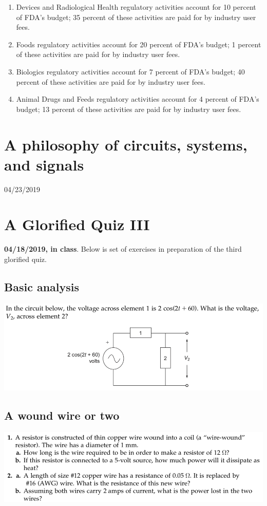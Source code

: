 \documentclass[11pt]{book}
\begin{document}
\begin{enumerate}
	\item Devices and Radiological Health regulatory activities account for 10 percent of FDA’s budget; 35 percent of these activities are paid for by industry user fees.
	\item Foods regulatory activities account for 20 percent of FDA’s budget; 1 percent of these activities are paid for by industry user fees.
	\item Biologics regulatory activities account for 7 percent of FDA’s budget; 40 percent of these activities are paid for by industry user fees.
	\item Animal Drugs and Feeds regulatory activities account for 4 percent of FDA’s budget; 13 percent of these activities are paid for by industry user fees.
\end{enumerate}




\chapter{A philosophy of circuits, systems, and signals}
04/23/2019



\chapter*{A Glorified Quiz III}
\textbf{04/18/2019, in class}. Below is set of exercises in preparation of the third glorified quiz.

\minitoc

\newpage


\section{Basic analysis}
\begin{center}
	\includegraphics[width=\textwidth]{figures/q3.09.png}
\end{center}

\newpage

\section{A wound wire or two}
\begin{center}
	\includegraphics[width=\textwidth]{figures/q3.10.png}
\end{center}
\end{document}
